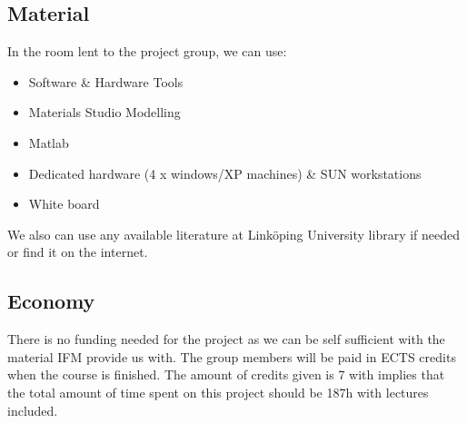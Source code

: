 \subsection{Material}

In the room lent to the project group, we can use:

\begin{itemize}
	\item Software {\&} Hardware Tools
	\item Materials Studio Modelling
	\item Matlab
	\item Dedicated hardware (4 x windows/XP machines) {\&} SUN workstations
	\item White board
\end{itemize}

We also can use any available literature at Linköping University library if needed or find it on the internet.

\subsection{Economy}

There is no funding needed for the project as we can be self sufficient with the material IFM provide us with. The group members will be paid in ECTS credits when the course is finished. The amount of credits given is 7 with implies that the total amount of time spent on this project should be 187h with lectures included.












